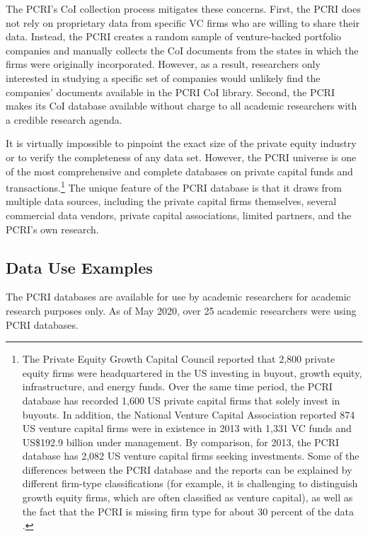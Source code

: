 The PCRI's CoI collection process mitigates these concerns. First, the PCRI does not rely on proprietary data from specific VC firms who are willing to share their data. Instead, the PCRI creates a random sample of venture-backed portfolio companies and manually collects the CoI documents from the states in which the firms were originally incorporated. However, as a result, researchers only interested in studying a specific set of companies would unlikely find the companies' documents available in the PCRI CoI library. Second, the PCRI makes its CoI database available without charge to all academic researchers with a credible research agenda.

It is virtually impossible to pinpoint the exact size of the private equity industry or to verify the completeness of any data set. However, the PCRI universe is one of the most comprehensive and complete databases on private capital funds and transactions.\footnote{The Private Equity Growth Capital Council \citeyearpar{privateequitygrowthcapitalcouncil2013} reported that 2,800 private equity firms were headquartered in the US investing in buyout, growth equity, infrastructure, and energy funds. Over the same time period, the PCRI database has recorded 1,600 US private capital firms that solely invest in buyouts. In addition, the National Venture Capital Association reported 874 US venture capital firms were in existence in 2013 with 1,331 VC funds and US\$192.9 billion under management. By comparison, for 2013, the PCRI database has 2,082 US venture capital firms seeking investments. Some of the differences between the PCRI database and the reports can be explained by different firm-type classifications (for example, it is challenging to distinguish growth equity firms, which are often classified as venture capital), as well as the fact that the PCRI is missing firm type for about 30 percent of the data \citep{jeng2015}.} The unique feature of the PCRI database is that it draws from multiple data sources, including the private capital firms themselves, several commercial data vendors, private capital associations, limited partners, and the PCRI's own research.

\hypertarget{data-use-examples-2}{%
\subsection{Data Use Examples}\label{data-use-examples-2}}

The PCRI databases are available for use by academic researchers for academic research purposes only. As of May 2020, over 25 academic researchers were using PCRI databases.

